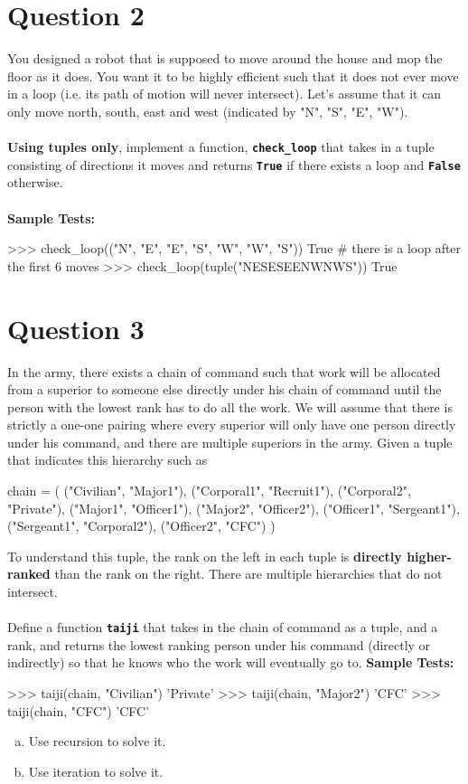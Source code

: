 \section{Question 2}
You designed a robot that is supposed to move around the house and mop the floor as it
does. You want it to be highly efficient such that it does not ever move in a loop (i.e. its path of
motion will never intersect). Let’s assume that it can only move north, south, east and west
(indicated by "N", "S", "E", "W"). \\ \\
\textbf{Using tuples only}, implement a function, \texttt{\bfseries check\_loop} that
takes in a tuple consisting of directions it moves and returns \texttt{\bfseries True} if there exists a loop and
\texttt{\bfseries False} otherwise. \\ \\
\textbf{Sample Tests:}
\begin{python}
>>> check_loop(("N", "E", "E", "S", "W", "W", "S"))
True # there is a loop after the first 6 moves
>>> check_loop(tuple("NESESEENWNWS"))
True
\end{python}

\section{Question 3}
In the army, there exists a chain of command such that work will be allocated from a
superior to someone else directly under his chain of command until the person with the lowest
rank has to do all the work. We will assume that there is strictly a one-one pairing where every
superior will only have one person directly under his command, and there are multiple
superiors in the army. Given a tuple that indicates this hierarchy such as
\begin{python}
chain = (
    ("Civilian", "Major1"), ("Corporal1", "Recruit1"),
    ("Corporal2", "Private"), ("Major1", "Officer1"),
    ("Major2", "Officer2"), ("Officer1", "Sergeant1"),
    ("Sergeant1", "Corporal2"), ("Officer2", "CFC")
    )
\end{python}
To understand this tuple, the rank on the left in each tuple is \textbf{directly higher-ranked} than the
rank on the right. There are multiple hierarchies that do not intersect. \\ \\
Define a function \texttt{\bfseries taiji} that takes in the chain of command as a tuple, and a rank, and
returns the lowest ranking person under his command (directly or indirectly) so that he knows
who the work will eventually go to.
\newpage
\textbf{Sample Tests:}
\begin{python}
>>> taiji(chain, "Civilian")
'Private'
>>> taiji(chain, "Major2")
'CFC'
>>> taiji(chain, "CFC")
'CFC'
\end{python}
\begin{enumerate}[(a)]
\item Use recursion to solve it.
\item Use iteration to solve it.
\end{enumerate}

